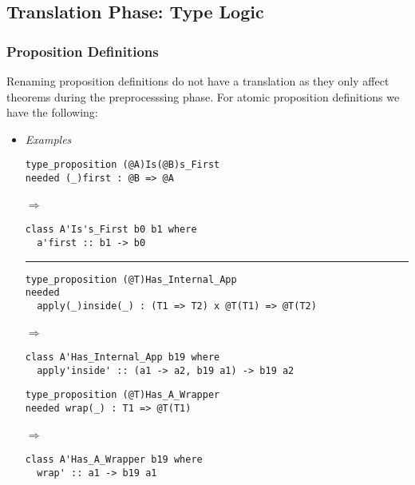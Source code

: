 \documentclass{article}
\def\lra{$\Longrightarrow$\ }
\begin{document}
\newpage
\subsection{Translation Phase: Type Logic}

\subsubsection{Proposition Definitions}

Renaming proposition definitions do not have a translation as they only
affect theorems during the preprocesssing phase. For atomic proposition
definitions we have the following:

\begin{itemize}

\item
\textit{Examples}\\

\begin{minipage}{0.55\linewidth}
\begin{verbatim}
type_proposition (@A)Is(@B)s_First
needed (_)first : @B => @A
\end{verbatim}

\lra

\begin{verbatim}
class A'Is's_First b0 b1 where
  a'first :: b1 -> b0
\end{verbatim}

\rule{\linewidth}{0.1pt}

\begin{verbatim}
type_proposition (@T)Has_Internal_App
needed
  apply(_)inside(_) : (T1 => T2) x @T(T1) => @T(T2)
\end{verbatim}

\lra

\begin{verbatim}
class A'Has_Internal_App b19 where
  apply'inside' :: (a1 -> a2, b19 a1) -> b19 a2

\end{verbatim}
\end{minipage}
\hfill\vline\hfill
\begin{minipage}{0.40\linewidth}
\begin{verbatim}
type_proposition (@T)Has_A_Wrapper
needed wrap(_) : T1 => @T(T1)
\end{verbatim}

\lra

\begin{verbatim}
class A'Has_A_Wrapper b19 where
  wrap' :: a1 -> b19 a1
\end{verbatim}


\end{minipage}
\end{itemize}
\end{document}
